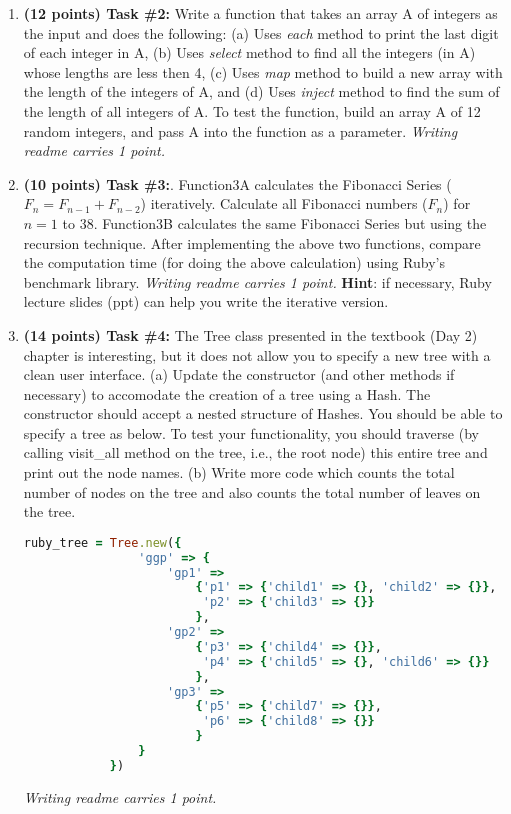 \documentclass[paper=letter, fontsize=11pt]{scrartcl} %
\begin{document}
\begin{enumerate}[noitemsep]
  \item \textbf{(12 points) Task \#2:} Write a function that takes an array A of integers 
as the input 
and does the following: (a) Uses \emph{each} method to print the last digit of each integer in A, 
(b) Uses \emph{select} method to find all the integers (in A) whose lengths are less then 4, 
(c) Uses \emph{map} method to build a new array with the length of the integers of A, 
and (d) Uses \emph{inject} method to find the sum of the length of all integers of A.
To test the function, build an array A of 12 random integers, 
and pass A into the function as a parameter.
\emph{Writing readme carries 1 point.}
        \item \textbf{(10 points) Task \#3:}. Function3A calculates the Fibonacci Series ($F_n = F_{n-1} + F_{n-2}$) iteratively. 
Calculate all Fibonacci numbers ($F_n$) for $n=1$ to 38. 
Function3B calculates the same Fibonacci Series but using the recursion technique. 
After implementing the above two functions, compare the computation time (for doing the above calculation) 
using Ruby's benchmark library. \emph{Writing readme carries 1 point.}
\textbf{Hint}: if necessary, Ruby lecture slides (ppt) can help you write the iterative version.
        \item \textbf{(14 points) Task \#4:} The Tree class presented in the textbook (Day 2) chapter is interesting, but it does not allow 
you to specify a new tree with a clean user interface. (a) Update the constructor (and other methods if necessary) to accomodate the creation of a tree using a Hash. 
The constructor should accept a nested structure of Hashes. You should be able to specify a tree as below. 
To test your functionality, you should traverse (by calling visit\_all method on the tree, i.e., the root node) 
this entire tree and print out the node names. (b) Write more code which counts the total number of nodes on the tree and also counts the total number of leaves on the tree.

        \begin{lstlisting}[language=Ruby]
            ruby_tree = Tree.new({
                'ggp' => { 
                    'gp1' => 
                        {'p1' => {'child1' => {}, 'child2' => {}},
                         'p2' => {'child3' => {}} 
                        }, 
                    'gp2' => 
                        {'p3' => {'child4' => {}}, 
                         'p4' => {'child5' => {}, 'child6' => {}} 
                        },
                    'gp3' => 
                        {'p5' => {'child7' => {}}, 
                         'p6' => {'child8' => {}} 
                        }
                } 
            })
        \end{lstlisting}
\emph{Writing readme carries 1 point.}


\end{enumerate}
\end{document}
